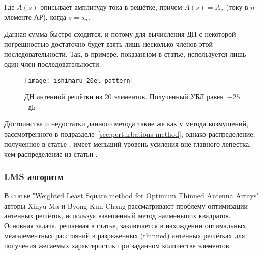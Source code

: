 Где $A(s)$ описывает амплитуду тока в решётке, причем $A(s)=A_n$ (току в $n$ элементе АР), когда $s=s_n$.

Данная сумма быстро сходится, и потому для вычисления ДН с некоторой погрешностью достаточно будет взять лишь
несколько членов этой последовательности. Так, в примере, показанном в статье, используется лишь
один член последовательности.

\begin{figure}[H]
    \centering
    \texttt{[image: ishimaru-20el-pattern]}
    \caption{ДН антенной решётки из 20 элементов. Полученный УБЛ равен~$-25$~дБ}%
    \label{fig:ishimaru-20el-pattern}
\end{figure}

Достоинства и недостатки данного метода такие же как у метода возмущений,
рассмотренного в подразделе~\ref{sec:perturbations-method}, однако распределение, полученное в статье
\cite{ishimaru1962theory}, имеет меньший уровень усиления вне главного лепестка,
чем распределение из статьи \cite{harrington1961sidelobe}.

\subsubsection{LMS алгоритм}\label{sec:lms-algorithm}

В статье "Weighted Least Square method for Optimum Thinned Antenna Arrays" авторы Xinyu Ma и Byong Kun Chang
рассматривают проблему оптимизации антенных решёток, используя взвешенный метод наименьших квадратов. Основная
задача, решаемая в статье, заключается в нахождении оптимальных межэлементных расстояний в разреженных (thinned)
антенных решётках для получения желаемых характеристик при заданном количестве элементов.

